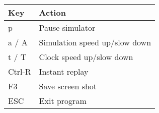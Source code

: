 \begin{tabular}{|l|l|}\hline
 Key          & Action\\\hline
  p           & Pause simulator \index{pause}\\
  a / A       & Simulation speed up/slow down\\
  t / T       & Clock speed up/slow down       \\
  Ctrl-R      & Instant replay \\
  F3          & Save screen shot\\
  ESC         & Exit program\\\hline
 \end{tabular}

